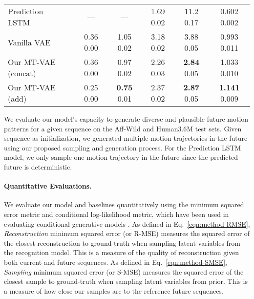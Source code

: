 \documentclass[runningheads]{llncs}
\begin{document}
\begin{table}[t]
\begin{subtable}{1.0\textwidth}
\begin{tabular}{l||c|c||c|c||c}
Prediction LSTM~\cite{villegas2017learning} & --- & --- & 1.69  0.02 & 11.2  0.17 & 0.602  0.002\\
Vanilla VAE~\cite{mohammad2018stochastic} & 0.36  0.00 & 1.05  0.02 & 3.18  0.02 & 3.88  0.05 & 0.993  0.011\\
\hline
Our MT-VAE (concat) & 0.36  0.00 & 0.97  0.02 & 2.26  0.03 & \textbf{2.84}  0.05 & 1.033  0.010\\
Our MT-VAE (add) & 0.25  0.00 & \textbf{0.75}  0.01 & 2.37  0.02 & \textbf{2.87}  0.05 & \textbf{1.141}  0.009\\
\hline
\end{tabular}
\end{subtable}
\label{tab:table_seqgen}
\vspace*{-0.2in}
\end{table}

We evaluate our model's capacity to generate diverse and plausible future motion patterns for a given sequence on the Aff-Wild and Human3.6M test sets.
Given sequence  as initialization, we generated multiple motion trajectories in the future using our proposed sampling and generation process.
For the Prediction LSTM model, we only sample one motion trajectory in the future since the predicted future is deterministic. 

\paragraph{Quantitative Evaluations.}
\vspace*{-0.1in}
We evaluate our model and baselines quantitatively using the minimum squared error metric and conditional log-likelihood metric, which have been used in evaluating conditional generative models \cite{sohn2015learning,walker2016uncertain,yan2016attribute2image,mohammad2018stochastic}.
As defined in Eq.~\ref{eqn:method-RMSE},
\textit{Reconstruction} minimum squared error (or R-MSE) measures the squared error of the closest reconstruction to ground-truth when sampling latent variables from the recognition model. This is a measure of the quality of reconstruction given both current and future sequences. 
As defined in Eq.~\ref{eqn:method-SMSE},
\textit{Sampling} minimum squared error (or S-MSE) measures the squared error of the closest sample to ground-truth when sampling latent variables from prior. 
This is a measure of how close our samples are to the reference future sequences.
\end{document}
